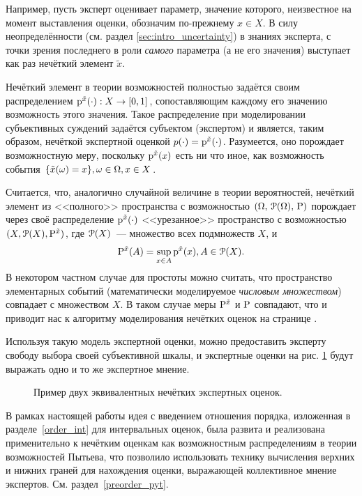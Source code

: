 Например, пусть эксперт оценивает параметр, значение которого, неизвестное на момент выставления оценки, обозначим по-прежнему $x \in X$. В силу неопределённости (см. раздел \ref{sec:intro_uncertainty}) в знаниях эксперта, с точки зрения последнего в роли \emph{самого} параметра (а не его значения) выступает как раз нечёткий элемент $\tilde x$.

Нечёткий элемент в теории возможностей полностью задаётся своим распределением $\p^{\tilde x}(\cdot): X \rightarrow \zo$, сопоставляющим каждому его значению возможность этого значения. Такое распределение при моделировании субъективных суждений задаётся субъектом (экспертом) и является, таким образом, нечёткой экспертной оценкой $p(\cdot) = \p^{\tilde x}(\cdot)$. Разумеется, оно порождает возможностную меру, поскольку $\p^{\tilde x}(x)$ есть ни что иное, как возможность события $\{\tilde x(\om) = x\}, \om \in \Om, x \in X$.

Считается, что, аналогично случайной величине в теории вероятностей, нечёткий элемент из <<полного>> пространства с возможностью $\OAP$ порождает через своё распределение $\p^{\tilde x}(\cdot)$ <<урезанное>> пространство с возможностью $(X, \Po(X), \P^{\tilde x})$, где $\Po(X)$~--- множество всех подмножеств $X$, и
\begin{equation*}
	\P^{\tilde x}(A) = \sup_{x \in A} \p^{\tilde x}(x), A \in \Po(X).
\end{equation*} 
В некотором частном случае для простоты можно считать, что пространство элементарных событий (математически моделируемое \emph{числовым множеством}) совпадает с множеством $X$. В таком случае меры $\P^{\tilde x}$ и $\P$ совпадают, что и приводит нас к алгоритму моделирования нечётких оценок на странице \pageref{zadeh_fuzzy_asset_alg}.

Используя такую модель экспертной оценки, можно предоставить эксперту свободу выбора своей субъективной шкалы, и экспертные оценки на рис. \ref{ris:fuzzy_ass03} будут выражать одно и то же экспертное мнение.
\begin{figure}[h]
\caption{\small Пример двух эквивалентных нечётких экспертных оценок.}
\label{ris:fuzzy_ass03}
\end{figure}

В рамках настоящей работы идея с введением отношения порядка, изложенная в разделе~\ref{order_int} для интервальных оценок, была развита и реализована применительно к нечётким оценкам как возможностным распределениям в теории возможностей Пытьева, что позволило использовать технику вычисления верхних и нижних граней для нахождения оценки, выражающей коллективное мнение экспертов. См. раздел~\ref{preorder_pyt}.

